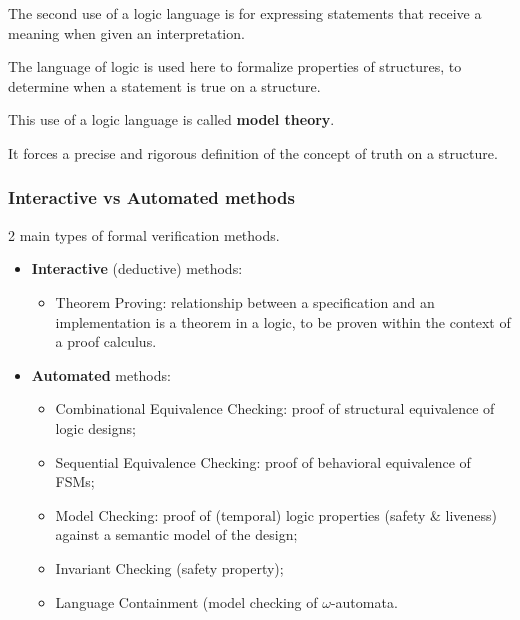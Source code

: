 \documentclass[a4paper,11pt]{article}
\begin{document}
The second use of a logic language is for
expressing statements that receive a meaning
when given an interpretation.

The language of logic is used here to formalize
properties of structures, to determine when a
statement is true on a structure.

This use of a logic language is called
\textbf{model theory}.

It forces a
precise and
rigorous definition of the
concept of
truth on a structure.

\subsubsection{Interactive vs Automated methods}

2 main types of formal verification methods.

\begin{itemize}
	\item \textbf{Interactive} (deductive) methods:
\begin{itemize}
	\item 
Theorem Proving: relationship between a specification and an
implementation is a theorem in a logic, to be proven within the
context of a proof calculus.
\end{itemize}

	\item \textbf{Automated} methods:
		\begin{itemize}
			\item Combinational Equivalence Checking: proof of structural equivalence
of logic designs;
\item Sequential Equivalence Checking: proof of behavioral equivalence of
FSMs;
\item Model Checking: proof of (temporal) logic properties (safety \&
liveness) against a semantic model of the design;
\item Invariant Checking (safety property);
\item Language Containment (model checking of $\omega$-automata.
		\end{itemize}
\end{itemize}
\end{document}
